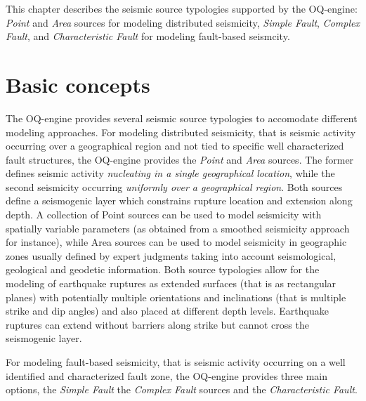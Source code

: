 This chapter describes the seismic source typologies supported by the OQ-engine:
\textit{Point} and \textit{Area} sources for modeling distributed seismicity,
\textit{Simple Fault}, \textit{Complex Fault}, and \textit{Characteristic Fault}
for modeling fault-based seismcity.

\section{Basic concepts}
The OQ-engine provides several seismic source typologies to accomodate different
modeling approaches. For modeling distributed seismicity, that is seismic
activity occurring over a geographical region and not tied to specific well
characterized fault structures, the OQ-engine provides the \textit{Point} and
\textit{Area} sources. The former defines seismic activity \textit{nucleating in
a single geographical location}, while the second seismicity occurring
\textit{uniformly over a geographical region}. 
% 
Both sources define a seismogenic layer which constrains rupture location and
extension along depth. A collection of Point sources can be used to model
seismicity with spatially variable parameters (as obtained from a smoothed
seismicity approach for instance), while Area sources can be used to model
seismicity in geographic zones usually defined by expert judgments taking into
account seismological, geological and geodetic information. 
%
Both source typologies allow for the modeling of earthquake ruptures as extended
surfaces (that is as rectangular planes) with potentially multiple orientations
and inclinations (that is multiple strike and dip angles) and also placed at
different depth levels. Earthquake ruptures can extend without barriers along
strike but cannot cross the seismogenic layer.

For modeling fault-based seismicity, that is seismic activity occurring on a
well identified and characterized fault zone, the OQ-engine provides three 
main options, the \textit{Simple Fault} the \textit{Complex Fault} sources and
the \textit{Characteristic Fault}. 

